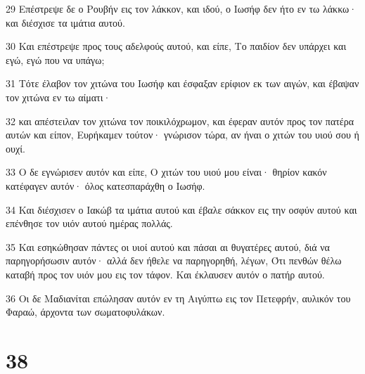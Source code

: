 \par 29 Επέστρεψε δε ο Ρουβήν εις τον λάκκον, και ιδού, ο Ιωσήφ δεν ήτο εν τω λάκκω· και διέσχισε τα ιμάτια αυτού.
\par 30 Και επέστρεψε προς τους αδελφούς αυτού, και είπε, Το παιδίον δεν υπάρχει και εγώ, εγώ που να υπάγω;
\par 31 Τότε έλαβον τον χιτώνα του Ιωσήφ και έσφαξαν ερίφιον εκ των αιγών, και έβαψαν τον χιτώνα εν τω αίματι·
\par 32 και απέστειλαν τον χιτώνα τον ποικιλόχρωμον, και έφεραν αυτόν προς τον πατέρα αυτών και είπον, Ευρήκαμεν τούτον· γνώρισον τώρα, αν ήναι ο χιτών του υιού σου ή ουχί.
\par 33 Ο δε εγνώρισεν αυτόν και είπε, Ο χιτών του υιού μου είναι· θηρίον κακόν κατέφαγεν αυτόν· όλος κατεσπαράχθη ο Ιωσήφ.
\par 34 Και διέσχισεν ο Ιακώβ τα ιμάτια αυτού και έβαλε σάκκον εις την οσφύν αυτού και επένθησε τον υιόν αυτού ημέρας πολλάς.
\par 35 Και εσηκώθησαν πάντες οι υιοί αυτού και πάσαι αι θυγατέρες αυτού, διά να παρηγορήσωσιν αυτόν· αλλά δεν ήθελε να παρηγορηθή, λέγων, Ότι πενθών θέλω καταβή προς τον υιόν μου εις τον τάφον. Και έκλαυσεν αυτόν ο πατήρ αυτού.
\par 36 Οι δε Μαδιανίται επώλησαν αυτόν εν τη Αιγύπτω εις τον Πετεφρήν, αυλικόν του Φαραώ, άρχοντα των σωματοφυλάκων.

\chapter{38}

